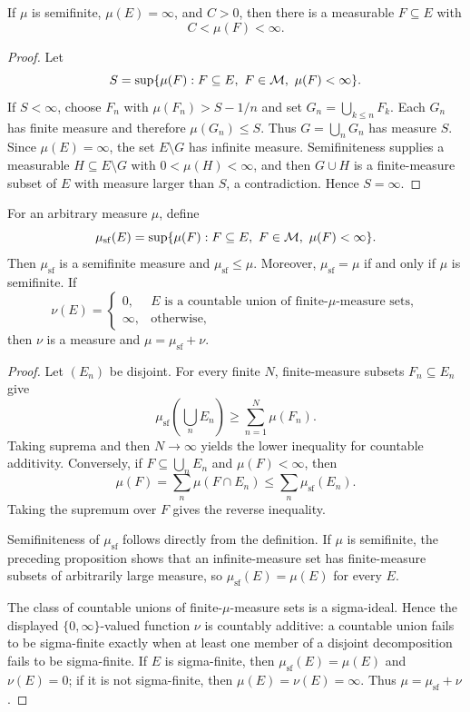 \begin{prop}
If $\mu$ is semifinite, $\mu(E)=\infty$, and $C>0$, then there is a measurable $F\subseteq E$ with
\[
C<\mu(F)<\infty.
\]
\end{prop}

\begin{proof}
Let
\[
S=\sup\{\mu(F):F\subseteq E,\ F\in\cM,\ \mu(F)<\infty\}.
\]
If $S<\infty$, choose $F_n$ with $\mu(F_n)>S-1/n$ and set $G_n=\bigcup_{k\leq n}F_k$. Each $G_n$ has finite measure and therefore $\mu(G_n)\leq S$. Thus $G=\bigcup_nG_n$ has measure $S$. Since $\mu(E)=\infty$, the set $E\setminus G$ has infinite measure. Semifiniteness supplies a measurable $H\subseteq E\setminus G$ with $0<\mu(H)<\infty$, and then $G\cup H$ is a finite-measure subset of $E$ with measure larger than $S$, a contradiction. Hence $S=\infty$.
\end{proof}

\begin{prop}
For an arbitrary measure $\mu$, define
\[
\mu_{\mathrm{sf}}(E)
 =\sup\{\mu(F):F\subseteq E,\ F\in\mathcal{M},\ \mu(F)<\infty\}.
\]
Then $\mu_{\mathrm{sf}}$ is a semifinite measure and $\mu_{\mathrm{sf}}\leq\mu$. Moreover, $\mu_{\mathrm{sf}}=\mu$ if and only if $\mu$ is semifinite. If
\[
\nu(E)=
\begin{cases}
0,&E\text{ is a countable union of finite-$\mu$-measure sets},\\
\infty,&\text{otherwise},
\end{cases}
\]
then $\nu$ is a measure and $\mu=\mu_{\mathrm{sf}}+\nu$.
\end{prop}

\begin{proof}
Let $(E_n)$ be disjoint. For every finite $N$, finite-measure subsets $F_n\subseteq E_n$ give
\[
\mu_{\mathrm{sf}}\left(\bigcup_nE_n\right)
 \geq\sum_{n=1}^N\mu(F_n).
\]
Taking suprema and then $N\to\infty$ yields the lower inequality for countable additivity. Conversely, if $F\subseteq\bigcup_nE_n$ and $\mu(F)<\infty$, then
\[
\mu(F)=\sum_n\mu(F\cap E_n)
 \leq\sum_n\mu_{\mathrm{sf}}(E_n).
\]
Taking the supremum over $F$ gives the reverse inequality.

Semifiniteness of $\mu_{\mathrm{sf}}$ follows directly from the definition. If $\mu$ is semifinite, the preceding proposition shows that an infinite-measure set has finite-measure subsets of arbitrarily large measure, so $\mu_{\mathrm{sf}}(E)=\mu(E)$ for every $E$.

The class of countable unions of finite-$\mu$-measure sets is a sigma-ideal. Hence the displayed $\{0,\infty\}$-valued function $\nu$ is countably additive: a countable union fails to be sigma-finite exactly when at least one member of a disjoint decomposition fails to be sigma-finite. If $E$ is sigma-finite, then $\mu_{\mathrm{sf}}(E)=\mu(E)$ and $\nu(E)=0$; if it is not sigma-finite, then $\mu(E)=\nu(E)=\infty$. Thus $\mu=\mu_{\mathrm{sf}}+\nu$.
\end{proof}

